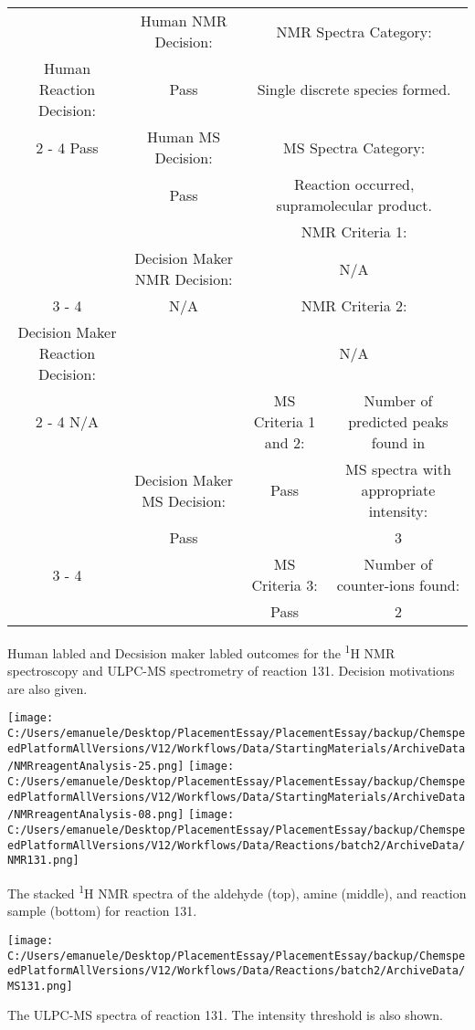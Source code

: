 \documentclass{article}%
\begin{document}
\begin{Decision Table}[H]%
\begin{tabular}{|c|c|c|c|}%
\hline%
&Human NMR Decision:&\multicolumn{2}{|c|}{NMR Spectra Category:}\\%
Human Reaction Decision:&Pass&\multicolumn{2}{|c|}{Single discrete species formed.}\\%
\cline{2%
-%
4}%
Pass&Human MS Decision:&\multicolumn{2}{|c|}{MS Spectra Category:}\\%
&Pass&\multicolumn{2}{|c|}{Reaction occurred, supramolecular product.}\\%
\hline%
&&\multicolumn{2}{|c|}{NMR Criteria 1:}\\%
&Decision Maker NMR Decision:&\multicolumn{2}{|c|}{N/A}\\%
\cline{3%
-%
4}%
&N/A&\multicolumn{2}{|c|}{NMR Criteria 2:}\\%
Decision Maker Reaction Decision:&&\multicolumn{2}{|c|}{N/A}\\%
\cline{2%
-%
4}%
N/A&&MS Criteria 1 and 2:&Number of predicted peaks found in\\%
&Decision Maker MS Decision:&Pass&MS spectra with appropriate intensity:\\%
&Pass&&3\\%
\cline{3%
-%
4}%
&&MS Criteria 3:&Number of counter{-}ions found:\\%
&&Pass&2\\%
\hline%
\end{tabular}%
\caption{Human labled and Decsision maker labled outcomes for the \textsuperscript{1}H NMR spectroscopy and ULPC-MS spectrometry of reaction 131. Decision motivations are also given.}%
\end{Decision Table}%
\begin{NMR Spectra}[H]%
\begin{center}%
\texttt{[image: C:/Users/emanuele/Desktop/PlacementEssay/PlacementEssay/backup/ChemspeedPlatformAllVersions/V12/Workflows/Data/StartingMaterials/ArchiveData/NMRreagentAnalysis-25.png]}\hfill%
\texttt{[image: C:/Users/emanuele/Desktop/PlacementEssay/PlacementEssay/backup/ChemspeedPlatformAllVersions/V12/Workflows/Data/StartingMaterials/ArchiveData/NMRreagentAnalysis-08.png]}\hfill%
\texttt{[image: C:/Users/emanuele/Desktop/PlacementEssay/PlacementEssay/backup/ChemspeedPlatformAllVersions/V12/Workflows/Data/Reactions/batch2/ArchiveData/NMR131.png]}\hfill%
\end{center}%
\caption{The stacked \textsuperscript{1}H NMR spectra of the aldehyde (top), amine (middle), and reaction sample (bottom) for reaction 131.}%
\end{NMR Spectra}%
\begin{MS Spectra}[H]%
\begin{center}%
\texttt{[image: C:/Users/emanuele/Desktop/PlacementEssay/PlacementEssay/backup/ChemspeedPlatformAllVersions/V12/Workflows/Data/Reactions/batch2/ArchiveData/MS131.png]}\hfill%
\end{center}%
\caption{The ULPC-MS spectra of reaction 131. The intensity threshold is also shown.}%
\end{MS Spectra}%
\end{document}
